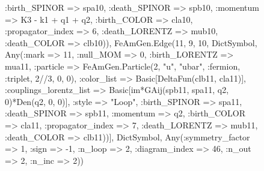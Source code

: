 \documentclass{revtex4}
\begin{document}
\begin{figure}[!htb]
\begin{center}
{:birth_SPINOR => spa10, :death_SPINOR => spb10, :momentum => K3 - k1 + q1 + q2, :birth_COLOR => cla10, :propagator_index => 6, :death_LORENTZ => mub10, :death_COLOR => clb10)), FeAmGen.Edge(11, 9, 10, Dict{Symbol, Any}(:mark => 11, :null_MOM => 0, :birth_LORENTZ => mua11, :particle => FeAmGen.Particle(2, "u", "ubar", :fermion, :triplet, 2//3, 0, 0), :color_list => Basic[DeltaFun(clb11, cla11)], :couplings_lorentz_list => Basic[im*GAij(spb11, spa11, q2, 0)*Den(q2, 0, 0)], :style => "Loop", :birth_SPINOR => spa11, :death_SPINOR => spb11, :momentum => q2, :birth_COLOR => cla11, :propagator_index => 7, :death_LORENTZ => mub11, :death_COLOR => clb11))], Dict{Symbol, Any}(:symmetry_factor => 1, :sign => -1, :n_loop => 2, :diagram_index => 46, :n_out => 2, :n_inc => 2)) 
}
\end{center}
\end{figure}
\end{document}
